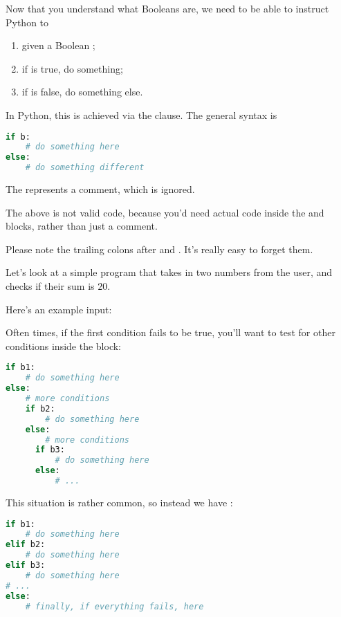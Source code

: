 Now that you understand what Booleans are, we need to be able to
instruct Python to

\begin{enumerate}
\item given a Boolean ;
\item if  is true, do something;
\item if  is false, do something else.
\end{enumerate}

In Python, this is achieved via the  clause. The general
syntax is

\begin{lstlisting}[language=Python]
if b:
    # do something here
else:
    # do something different
\end{lstlisting}

The \code{#} represents a comment, which is ignored.

\begin{remark}
  The above is not valid code, because you'd need actual code inside
  the  and  blocks, rather than just a comment.
\end{remark}

\begin{remark}
  Please note the trailing colons after  and
  . It's really easy to forget them.
\end{remark}

Let's look at a simple program that takes in two numbers from the
user, and checks if their sum is $20$.


Here's an example input:


Often times, if the first condition fails to be true, you'll want to
test for other conditions inside the  block:

\begin{lstlisting}[language=Python]
if b1:
    # do something here
else:
    # more conditions
    if b2:
        # do something here
    else:
        # more conditions
      if b3:
          # do something here
      else:
          # ...
\end{lstlisting}

This situation is rather common, so instead we have :

\begin{lstlisting}[language=Python]
if b1:
    # do something here
elif b2:
    # do something here
elif b3:
    # do something here
# ...
else:
    # finally, if everything fails, here
\end{lstlisting}

